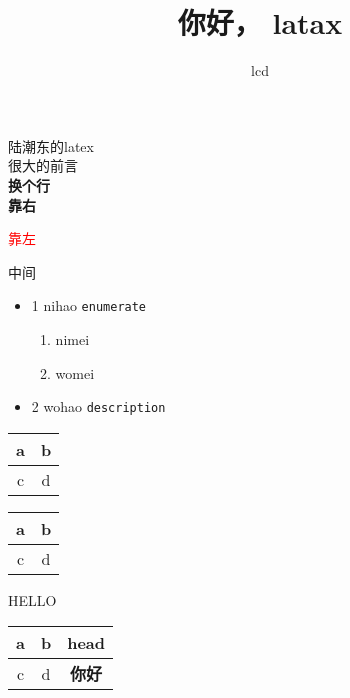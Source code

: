 \documentclass[a4paper, 12pt]{ctexart}
\begin{document}
\title{你好， latax}
\author{lcd}
\maketitle
\newpage


\begin{flushleft}
        \large{陆潮东的latex}\\
        \huge{很大的前言}\\
        \newline
        \bf{换个行} \\
        靠右
\end{flushleft}

\begin{flushright}
        \textcolor{red}{靠左}
\end{flushright}


\begin{center}
        中间
\end{center}

\begin{itemize}
        \item 1 nihao \texttt{enumerate}
                \begin{enumerate}
                        \item nimei
                        \item womei
                \end{enumerate}
        \item 2 wohao \texttt{description}
\end{itemize}


\newpage

\begin{tabular}{c|c}
        \hline
        a & b \\
        \hline
        c & d \\
        \hline
\end{tabular}

\begin{center}
        \begin{tabular}{|c|c|}
                \hline
                a & b \\ \hline
                c & d \\
                \hline
        \end{tabular}
\end{center}

\begin{center}
        HELLO \\ 
        \begin{tabular}{|c|c|c|}
                \hline
                a & b & head \\ 
                \hline
                c & d & \textbf{你好} \\
                \hline
        \end{tabular}
\end{center}
\end{document}
